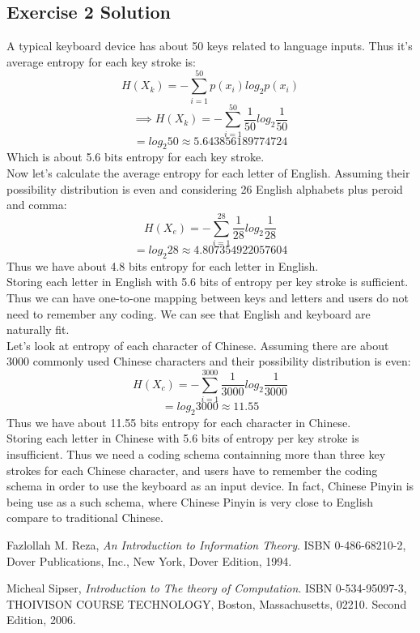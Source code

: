 \documentclass[12pt]{article}
\begin{document}
\subsection{Exercise 2 Solution}
A typical keyboard device has about 50 keys related to language inputs. Thus it's average entropy for each key stroke is:
\[
	H(X_k) = -\sum_{i=1}^{50}p(x_i)log_{2}p(x_i)
\]
\[
\implies
	H(X_k) = -\sum_{i=1}^{50}\frac{1}{50}log_{2}\frac{1}{50}
\]
\[
	= log_{2}50 \approx 5.643856189774724
\]
Which is about 5.6 bits entropy for each key stroke.\\
Now let's calculate the average entropy for each letter of English. Assuming their possibility distribution is even and considering 26 English alphabets plus peroid and comma:
\[
	H(X_e) = -\sum_{i=1}^{28}\frac{1}{28}log_{2}\frac{1}{28}
\]
\[
	= log_{2}28 \approx 4.807354922057604
\]
Thus we have about 4.8 bits entropy for each letter in English.\\
Storing each letter in English with 5.6 bits of entropy per key stroke is sufficient. Thus we can have one-to-one mapping between keys and letters and users do not need to remember any coding. We can see that English and keyboard are naturally fit.\\

Let's look at entropy of each character of Chinese. Assuming there are about 3000 commonly used Chinese characters and their possibility distribution is even: 
\[
	H(X_c) = -\sum_{i=1}^{3000}\frac{1}{3000}log_{2}\frac{1}{3000}
\]
\[
	= log_{2}3000 \approx 11.55
\]
Thus we have about 11.55 bits entropy for each character in Chinese.\\
Storing each letter in Chinese with 5.6 bits of entropy per key stroke is insufficient. Thus we need a coding schema containning more than three key strokes for each Chinese character, and users have to remember the coding schema in order to use the keyboard as an input device. In fact, Chinese Pinyin is being use as a such schema, where Chinese Pinyin is very close to English compare to traditional Chinese.\\

\begin{thebibliography}{9}

  Fazlollah M. Reza,
  \emph{An Introduction to Information Theory}.
  ISBN 0-486-68210-2,
  Dover Publications, Inc., New York,
  Dover Edition,
  1994.

  Micheal Sipser,
  \emph{Introduction to The theory of Computation}.
  ISBN 0-534-95097-3,
  THOIVISON COURSE TECHNOLOGY, Boston, Massachusetts, 02210.
  Second Edition,
  2006.

\end{thebibliography}

	
\end{document}
